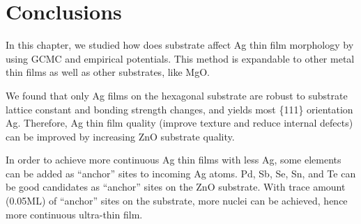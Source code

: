 \section{Conclusions}
In this chapter, we studied how does substrate affect Ag thin film morphology by using \ac{GCMC} and empirical potentials. This method is expandable to other metal thin films as well as other substrates, like MgO.

We found that only Ag films on the hexagonal substrate are robust to substrate lattice constant and bonding strength changes, and yields most \{111\} orientation Ag. Therefore, Ag thin film quality (improve texture and reduce internal defects) can be improved by increasing ZnO substrate quality. 

In order to achieve more continuous Ag thin films with less Ag, some elements can be added as ``anchor'' sites to incoming Ag atoms. Pd, Sb, Se, Sn, and Te can be good candidates as ``anchor'' sites on the ZnO substrate. With trace amount (0.05\ac{ML}) of ``anchor'' sites on the substrate, more nuclei can be achieved, hence more continuous ultra-thin film.